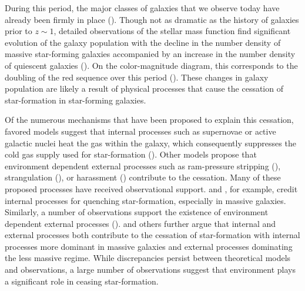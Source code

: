 \documentclass{emulateapj}
\begin{document}
During this period, the major classes of galaxies that we observe today have already been firmly in place (\citealt{bundy06a, borch06a, taylor09a, Moustakas:2013aa}). Though not as dramatic as the history of galaxies prior to $z \sim 1$, detailed observations of the stellar mass function find significant evolution of the galaxy population with the decline in the number density of massive star-forming galaxies accompanied by an increase in the number density of quiescent galaxies (\citealt{Blanton:2006aa, bundy06a,  borch06a, Moustakas:2013aa}). On the color-magnitude diagram, this corresponds to the doubling of the red sequence over this period (\citealt{Bell:2004aa, borch06a, Faber:2007aa}). These changes in galaxy population are likely a result of physical processes that cause the cessation of star-formation in star-forming galaxies. 

Of the numerous mechanisms that have been proposed to explain this cessation, favored models suggest that internal processes such as supernovae or active galactic nuclei heat the gas within the galaxy, which consequently suppresses the cold gas supply used for star-formation (\citealt{Keres:2005aa, Croton:2006aa, Dekel:2008aa}). Other models propose that environment dependent external processes such as ram-pressure stripping (\citealt{Gunn:1972aa, Bekki:2009aa}), strangulation (\citealt{Larson:1980aa, Balogh:2000aa}), or harassment (\citealt{Moore:1998aa}) contribute to the cessation. Many of these proposed processes have received observational support. \cite{Weinmann:2006aa} and \cite{Peng:2010aa}, for example, credit internal processes for quenching star-formation, especially in massive galaxies. Similarly, a number of observations support the existence of environment dependent external processes (\citealt{Iovino:2010aa, geha12a, Kovac:2014aa}). \cite{Peng:2010aa} and others further argue that internal and external processes both contribute to the cessation of star-formation with internal processes more dominant in massive galaxies and external processes dominating the less massive regime. While discrepancies persist between theoretical models and observations, a large number of observations suggest that environment plays a significant role in ceasing star-formation. 

\end{document}
